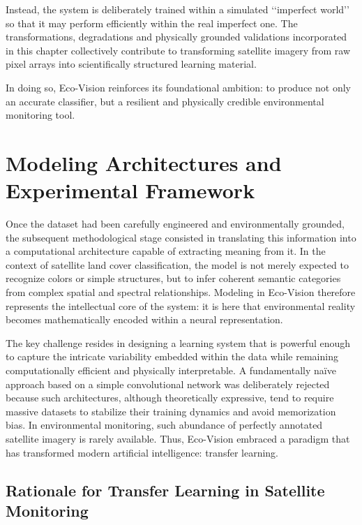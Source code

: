 \documentclass[12pt,a4paper]{report}
\begin{document}
Instead, the system is deliberately trained within a simulated ‘‘imperfect world’’ so that it may perform efficiently within the real imperfect one. The transformations, degradations and physically grounded validations incorporated in this chapter collectively contribute to transforming satellite imagery from raw pixel arrays into scientifically structured learning material.

In doing so, Eco-Vision reinforces its foundational ambition: to produce not only an accurate classifier, but a resilient and physically credible environmental monitoring tool.

\newpage

\chapter{Modeling Architectures and Experimental Framework}

Once the dataset had been carefully engineered and environmentally grounded, the subsequent methodological stage consisted in translating this information into a computational architecture capable of extracting meaning from it. In the context of satellite land cover classification, the model is not merely expected to recognize colors or simple structures, but to infer coherent semantic categories from complex spatial and spectral relationships. Modeling in Eco-Vision therefore represents the intellectual core of the system: it is here that environmental reality becomes mathematically encoded within a neural representation.

The key challenge resides in designing a learning system that is powerful enough to capture the intricate variability embedded within the data while remaining computationally efficient and physically interpretable. A fundamentally naïve approach based on a simple convolutional network was deliberately rejected because such architectures, although theoretically expressive, tend to require massive datasets to stabilize their training dynamics and avoid memorization bias. In environmental monitoring, such abundance of perfectly annotated satellite imagery is rarely available. Thus, Eco-Vision embraced a paradigm that has transformed modern artificial intelligence: transfer learning.

\section{Rationale for Transfer Learning in Satellite Monitoring}
\end{document}
